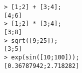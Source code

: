 \begin{center}\begin{minipage}{15cm}\begin{Verbatim}[frame=single]
> [1;2] + [3;4];
[4;6]
> [1;2] * [3;4];
[3;8]
> sqrt([9;25]);
[3;5]
> exp(sin([10;100]));
[0.36787942;2.718282]
\end{Verbatim}
\end{minipage}\end{center}
